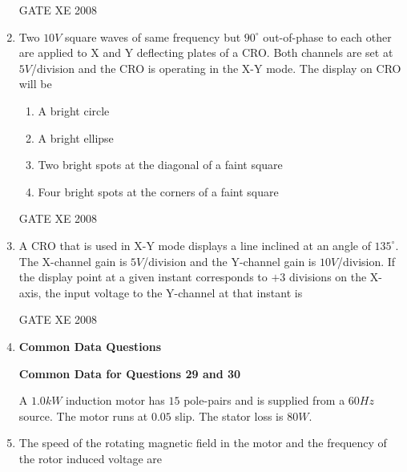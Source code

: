 \documentclass[12pt]{article}
\begin{document}
\begin{enumerate}[label=Q\arabic*.]
GATE XE 2008
\item  Two $10 V$ square waves of same frequency but $90^{\circ}$ out-of-phase to each other are applied to X and Y deflecting plates of a CRO. Both channels are set at $5 V$/division and the CRO is operating in the X-Y mode. The display on CRO will be

\begin{enumerate}[label=(\Alph*)]

\item  A bright circle

\item  A bright ellipse

\item  Two bright spots at the diagonal of a faint square

\item  Four bright spots at the corners of a faint square
\end{enumerate}

GATE XE 2008
\item  A CRO that is used in X-Y mode displays a line inclined at an angle of $135^{\circ}$. The X-channel gain is $5V$/division and the Y-channel gain is $10V$/division. If the display point at a given instant corresponds to $+ 3$ divisions on the X-axis, the input voltage to the Y-channel at that instant is

\begin{enumerate}[label=(\Alph*)]
\end{enumerate}

GATE XE 2008
\item[]\textbf{\Large Common Data Questions}

\textbf{Common Data for Questions 29 and 30}

A $1.0 kW$ induction motor has $15$ pole-pairs and is supplied from a $60 Hz$ source. The motor runs at $0.05$ slip. The stator loss is $80 W$.

\item  The speed of the rotating magnetic field in the motor and the frequency of the rotor induced voltage are

\begin{enumerate}[label=(\Alph*)]
\end{enumerate}


\end{enumerate}
\end{document}
